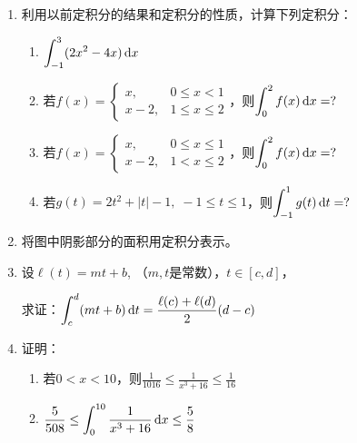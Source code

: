 \begin{ex}
\begin{enumerate}
    \item 利用以前定积分的结果和定积分的性质，计算下列定积分：
\begin{enumerate}
    \item $\displaystyle\int^3_{-1}(2x^2-4x)\,{\rm d} x$
    \item 若$f(x)=\begin{cases}
        x,& 0\le x<1\\
        x-2,& 1\le x\le 2
    \end{cases}$，则$\displaystyle\int^2_0 f(x)\,{\rm d} x=?$
    \item 若$f(x)=\begin{cases}
        x,& 0\le x\le 1\\
        x-2,& 1< x\le 2
    \end{cases}$，则$\displaystyle\int^2_0 f(x)\,{\rm d} x=?$
\item 若$g(t)=2t^2+|t|-1,\; -1\le t\le 1$，则$\displaystyle\int^1_{-1} g(t)\,{\rm d} t=?$
\end{enumerate}

\item 将图中阴影部分的面积用定积分表示。
\item 设$\ell(t)=mt+b$, （$m,t$是常数），$t\in [c,d]$，

求证：$\displaystyle\int^d_c (mt+b)\,{\rm d} t=\dfrac{\ell(c)+\ell(d)}{2}(d-c)$
\item 证明：
\begin{enumerate}
    \item 若$0<x<10$，则$\frac{1}{1016}\le\frac{1}{x^3+16}\le \frac{1}{16}$
    \item $\dfrac{5}{508}\le \displaystyle\int^{10}_0\dfrac{1}{x^3+16}\,{\rm d} x\le \dfrac{5}{8}$
\end{enumerate}
\end{enumerate}
\end{ex}

